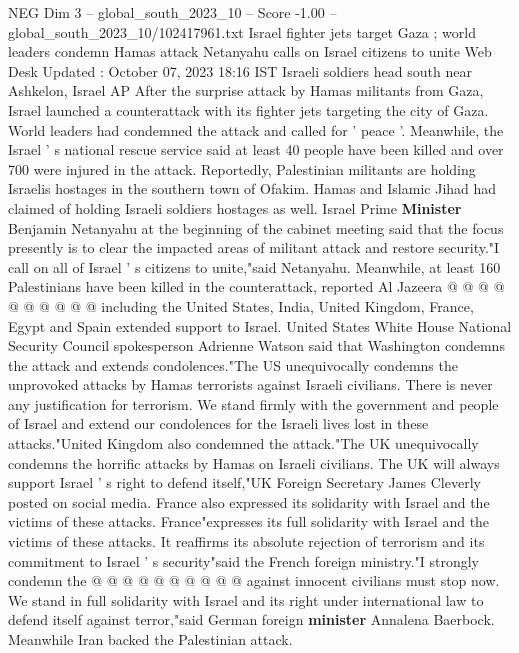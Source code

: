 \begin{textsample}{NEG Dim 3 – global\_south\_2023\_10 – Score -1.00 – global\_south\_2023\_10/102417961.txt}  \label{ex:f3_neg_025}
Israel fighter jets target Gaza ; world leaders condemn Hamas attack Netanyahu calls on Israel citizens to unite Web Desk Updated : October 07, 2023 18:16 IST Israeli soldiers head south near Ashkelon, Israel AP After the surprise attack by Hamas militants from Gaza, Israel launched a counterattack with its fighter jets targeting the city of Gaza.
World leaders had condemned the attack and called for ' peace '.
Meanwhile, the Israel ' s national rescue service said at least 40 people have been killed and over 700 were injured in the attack.
Reportedly, Palestinian militants are holding Israelis hostages in the southern town of Ofakim.
Hamas and Islamic Jihad had claimed of holding Israeli soldiers hostages as well.
Israel Prime \textbf{Minister} Benjamin Netanyahu at the beginning of the cabinet meeting said that the focus presently is to clear the impacted areas of militant attack and restore security."I call on all of Israel ' s citizens to unite,"said Netanyahu.
Meanwhile, at least 160 Palestinians have been killed in the counterattack, reported Al Jazeera @ @ @ @ @ @ @ @ @ @ including the United States, India, United Kingdom, France, Egypt and Spain extended support to Israel.
United States White House National Security Council spokesperson Adrienne Watson said that Washington condemns the attack and extends condolences."The US unequivocally condemns the unprovoked attacks by Hamas terrorists against Israeli civilians.
There is never any justification for terrorism.
We stand firmly with the government and people of Israel and extend our condolences for the Israeli lives lost in these attacks."United Kingdom also condemned the attack."The UK unequivocally condemns the horrific attacks by Hamas on Israeli civilians.
The UK will always support Israel ' s right to defend itself,"UK Foreign Secretary James Cleverly posted on social media.
France also expressed its solidarity with Israel and the victims of these attacks.
France"expresses its full solidarity with Israel and the victims of these attacks.
It reaffirms its absolute rejection of terrorism and its commitment to Israel ' s security"said the French foreign ministry."I strongly condemn the @ @ @ @ @ @ @ @ @ @ against innocent civilians must stop now.
We stand in full solidarity with Israel and its right under international law to defend itself against terror,"said German foreign \textbf{minister} Annalena Baerbock.
Meanwhile Iran backed the Palestinian attack.

\end{textsample}

